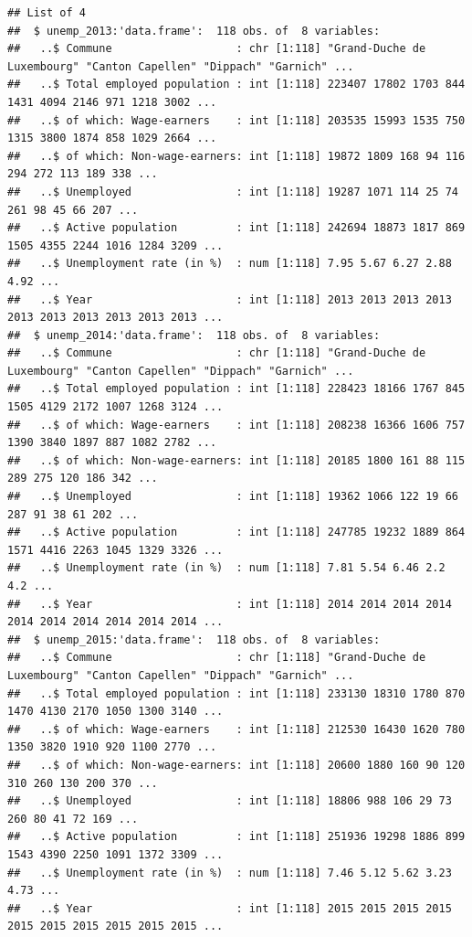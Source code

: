\documentclass[]{gitbook}
\theoremstyle{definition}
\theoremstyle{definition}
\theoremstyle{definition}
\theoremstyle{remark}
\begin{document}
\begin{verbatim}
## List of 4
##  $ unemp_2013:'data.frame':  118 obs. of  8 variables:
##   ..$ Commune                   : chr [1:118] "Grand-Duche de Luxembourg" "Canton Capellen" "Dippach" "Garnich" ...
##   ..$ Total employed population : int [1:118] 223407 17802 1703 844 1431 4094 2146 971 1218 3002 ...
##   ..$ of which: Wage-earners    : int [1:118] 203535 15993 1535 750 1315 3800 1874 858 1029 2664 ...
##   ..$ of which: Non-wage-earners: int [1:118] 19872 1809 168 94 116 294 272 113 189 338 ...
##   ..$ Unemployed                : int [1:118] 19287 1071 114 25 74 261 98 45 66 207 ...
##   ..$ Active population         : int [1:118] 242694 18873 1817 869 1505 4355 2244 1016 1284 3209 ...
##   ..$ Unemployment rate (in %)  : num [1:118] 7.95 5.67 6.27 2.88 4.92 ...
##   ..$ Year                      : int [1:118] 2013 2013 2013 2013 2013 2013 2013 2013 2013 2013 ...
##  $ unemp_2014:'data.frame':  118 obs. of  8 variables:
##   ..$ Commune                   : chr [1:118] "Grand-Duche de Luxembourg" "Canton Capellen" "Dippach" "Garnich" ...
##   ..$ Total employed population : int [1:118] 228423 18166 1767 845 1505 4129 2172 1007 1268 3124 ...
##   ..$ of which: Wage-earners    : int [1:118] 208238 16366 1606 757 1390 3840 1897 887 1082 2782 ...
##   ..$ of which: Non-wage-earners: int [1:118] 20185 1800 161 88 115 289 275 120 186 342 ...
##   ..$ Unemployed                : int [1:118] 19362 1066 122 19 66 287 91 38 61 202 ...
##   ..$ Active population         : int [1:118] 247785 19232 1889 864 1571 4416 2263 1045 1329 3326 ...
##   ..$ Unemployment rate (in %)  : num [1:118] 7.81 5.54 6.46 2.2 4.2 ...
##   ..$ Year                      : int [1:118] 2014 2014 2014 2014 2014 2014 2014 2014 2014 2014 ...
##  $ unemp_2015:'data.frame':  118 obs. of  8 variables:
##   ..$ Commune                   : chr [1:118] "Grand-Duche de Luxembourg" "Canton Capellen" "Dippach" "Garnich" ...
##   ..$ Total employed population : int [1:118] 233130 18310 1780 870 1470 4130 2170 1050 1300 3140 ...
##   ..$ of which: Wage-earners    : int [1:118] 212530 16430 1620 780 1350 3820 1910 920 1100 2770 ...
##   ..$ of which: Non-wage-earners: int [1:118] 20600 1880 160 90 120 310 260 130 200 370 ...
##   ..$ Unemployed                : int [1:118] 18806 988 106 29 73 260 80 41 72 169 ...
##   ..$ Active population         : int [1:118] 251936 19298 1886 899 1543 4390 2250 1091 1372 3309 ...
##   ..$ Unemployment rate (in %)  : num [1:118] 7.46 5.12 5.62 3.23 4.73 ...
##   ..$ Year                      : int [1:118] 2015 2015 2015 2015 2015 2015 2015 2015 2015 2015 ...

\end{verbatim}
\end{document}
